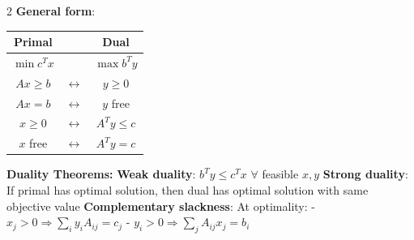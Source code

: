 \documentclass[8pt,a4paper,landscape]{article}
\newcommand{\mysubsection}[1]{\textbf{#1:}}
\begin{document}
\begin{multicols}{2}
\textbf{General form}:
\begin{tabular}{|c|c|c|}
\hline
Primal & & Dual \\
\hline
$\min c^Tx$ & & $\max b^Ty$ \\
$Ax \geq b$ & $\leftrightarrow$ & $y \geq 0$ \\
$Ax = b$ & $\leftrightarrow$ & $y$ free \\
$x \geq 0$ & $\leftrightarrow$ & $A^Ty \leq c$ \\
$x$ free & $\leftrightarrow$ & $A^Ty = c$ \\
\hline
\end{tabular}

\mysubsection{Duality Theorems}
\textbf{Weak duality}: $b^Ty \leq c^Tx$ $\forall$ feasible $x,y$
\textbf{Strong duality}: If primal has optimal solution, then dual has optimal solution with same objective value
\textbf{Complementary slackness}: At optimality:
- $x_j > 0 \Rightarrow \sum_i y_i A_{ij} = c_j$
- $y_i > 0 \Rightarrow \sum_j A_{ij}x_j = b_i$

\end{multicols}

\newpage
\end{document}
